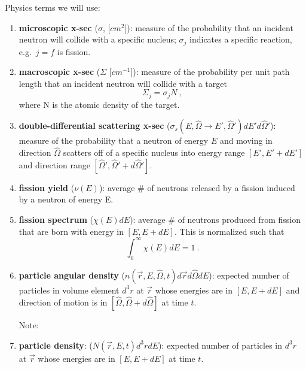 \documentclass[12pt]{article}
\newif\ifeqns
\newcommand{\vOmega}{\ensuremath{\hat{\Omega}}}
\begin{document}
Physics terms we will use:
\begin{enumerate}
\item \textbf{microscopic x-sec} ($\sigma$, [$cm^2$]): measure of the probability that an incident neutron will collide with a specific nucleus; $\sigma_j$ indicates a specific reaction, e.g.\ $j=f$ is fission.

\item \textbf{macroscopic x-sec} ($\Sigma$ [$cm^{-1}$]): measure of the probability per unit path length that an incident neutron will collide with a target
\[\Sigma_j = \sigma_j N\:,\]
where N is the atomic density of the target.

\item \textbf{double-differential scattering x-sec} ($\sigma_s(E, \vOmega \rightarrow E', \vOmega')dE' d\vOmega'$): measure of the probability that a neutron of energy $E$ and moving in direction $\vOmega$ scatters off of a specific nucleus into energy range $[E', E' + dE']$ and direction range $[\vOmega', \vOmega' + d\vOmega']$.

\item \textbf{fission yield} ($\nu(E)$): average \# of neutrons released by a fission induced by a neutron of energy E.

\item \textbf{fission spectrum} ($\chi(E)dE$): average \# of neutrons produced from fission that are born with energy in $[E, E + dE]$. This is normalized such that
\[\int_0^{\infty} \chi(E)dE =1\:.\]

\item \textbf{particle angular density} ($n(\vec{r}, E, \vOmega, t)d\vec{r} d\vOmega dE$): expected number of particles in volume element $d^3r$ at $\vec{r}$ whose energies are in $[E, E + dE]$ and direction of motion is in $[\vOmega, \vOmega + d\vOmega]$ at time $t$.

Note:
\ifeqns
\begin{align*}
n(\vec{r}, E, \vOmega, t) &= \frac{1}{mv}n(\vec{r}, v, \vOmega, t) \\
n(\vec{r}, v, \vOmega, t) &= v^2 n(\vec{r}, \vec{v}, t) \\
n(\vec{r}, \vec{v}, t) &= \frac{m}{v}n(\vec{r}, E, \vOmega, t)
\end{align*}
\else
\vspace*{3em}
\fi

\item \textbf{particle density}: ($N(\vec{r},E,t)d^3r dE$): expected number of particles in $d^3r$ at $\vec{r}$ whose energies are in $[E, E + dE]$ at time $t$.
\ifeqns
\[N(\vec{r},E,t)d^3r dE = \int_{4\pi} d\vOmega\: n(\vec{r}, E, \vOmega, t)d^3r dE \]
\else
\vspace*{2em}
\fi


\end{enumerate}
\end{document}
